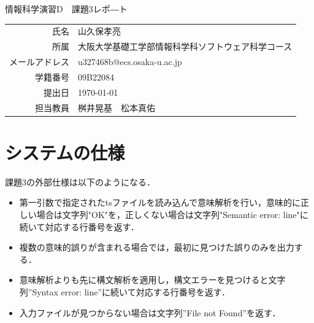 \documentclass[dvipdfmx]{jarticle}
\begin{document}
\begin{titlepage}
    \begin{center}
        {\huge 情報科学演習D　課題3レポ―ト}
        \vspace{180pt}\\
        \begin{tabular}{rl}
            氏名 & 山久保孝亮\\
            所属 & 大阪大学基礎工学部情報科学科ソフトウェア科学コース\\
            メールアドレス & u327468b@ecs.osaka-u.ac.jp\\
            学籍番号 & 09B22084\\
            提出日 & \today\\
            担当教員 & 桝井晃基　松本真佑
        \end{tabular}
    \end{center}
\end{titlepage}
\section{システムの仕様}
課題3の外部仕様は以下のようになる．
\begin{itemize}
  \item 第一引数で指定されたtsファイルを読み込んで意味解析を行い，意味的に正しい場合は文字列"OK"を，正しくない場合は文字列"Semantic error: line"に続いて対応する行番号を返す．
  \item 複数の意味的誤りが含まれる場合では，最初に見つけた誤りのみを出力する．
  \item 意味解析よりも先に構文解析を適用し，構文エラーを見つけると文字列”Syntax error: line”に続いて対応する行番号を返す．
  \item 入力ファイルが見つからない場合は文字列”File not Found”を返す．
\end{itemize}
\end{document}
